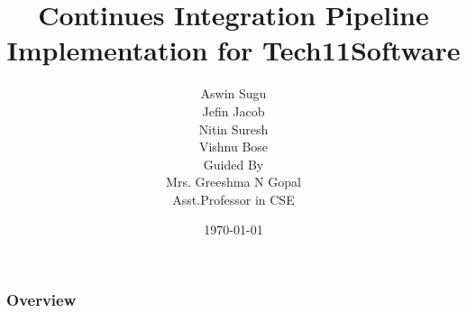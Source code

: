 \documentclass{beamer}
\title[] {Continues Integration Pipeline Implementation
for Tech11Software}
\author[]{Aswin Sugu\\Jefin Jacob\\Nitin Suresh\\Vishnu Bose\\Guided By\\Mrs. Greeshma N Gopal \\Asst.Professor in CSE}
\institute[CE CHERTHALA]{COLLEGE OF ENGINEERING CHERTHALA}
\date{\today}
\begin{document}
\begin{frame}
\titlepage %
\end{frame}

\begin{frame}
\frametitle{Overview} %
\tableofcontents %
\end{frame}




%
 

 
\end{document}
